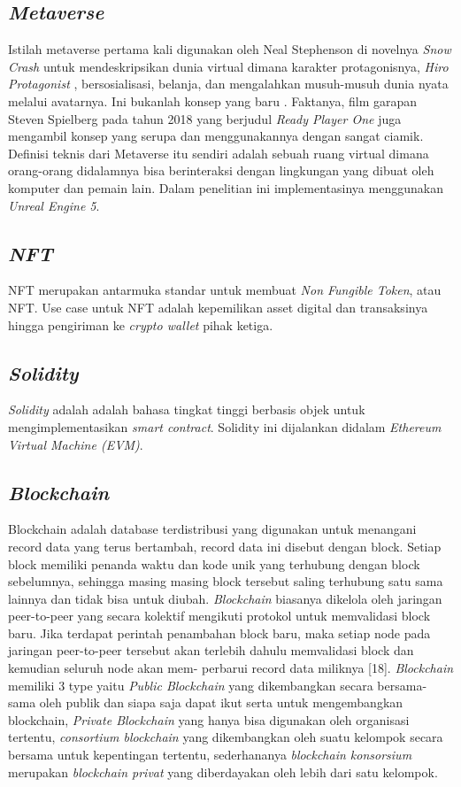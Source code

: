 \subsection{\emph{Metaverse}}

Istilah metaverse pertama kali digunakan oleh Neal Stephenson di novelnya \emph{Snow Crash} untuk
mendeskripsikan dunia virtual dimana karakter protagonisnya, \emph{Hiro Protagonist}
, bersosialisasi, belanja, dan mengalahkan musuh-musuh dunia nyata melalui avatarnya. Ini bukanlah konsep yang baru
. Faktanya, film garapan Steven Spielberg pada tahun 2018 yang berjudul \emph{Ready Player One} juga mengambil konsep yang serupa dan
menggunakannya dengan sangat ciamik. Definisi teknis dari Metaverse itu sendiri adalah sebuah ruang virtual dimana orang-orang didalamnya bisa berinteraksi
dengan lingkungan yang dibuat oleh komputer dan pemain lain. Dalam penelitian ini implementasinya menggunakan
\emph{Unreal Engine 5}.

\subsection{\emph{NFT}}
NFT merupakan antarmuka standar untuk membuat \emph{Non Fungible Token}, atau NFT.
Use case untuk NFT adalah kepemilikan asset digital dan transaksinya hingga pengiriman ke
\emph{crypto wallet} pihak ketiga.

\subsection{\emph{Solidity}}
\emph{Solidity} adalah adalah bahasa tingkat tinggi berbasis objek untuk mengimplementasikan
\emph{smart contract}. Solidity ini dijalankan didalam \emph{Ethereum Virtual Machine (EVM)}.


\subsection{\emph{Blockchain}}

Blockchain adalah database terdistribusi yang digunakan
untuk menangani record data yang terus bertambah, record data ini
disebut dengan block. Setiap block memiliki penanda waktu dan
kode unik yang terhubung dengan block sebelumnya, sehingga masing
masing block tersebut saling terhubung satu sama lainnya dan
tidak bisa untuk diubah. \emph{Blockchain} biasanya dikelola oleh jaringan
peer-to-peer yang secara kolektif mengikuti protokol untuk
memvalidasi block baru. Jika terdapat perintah penambahan block baru,
maka setiap node pada jaringan peer-to-peer tersebut akan terlebih
dahulu memvalidasi block dan kemudian seluruh node akan mem-
perbarui record data miliknya [18]. \emph{Blockchain} memiliki 3 type \parencite{url:blockchaintype}
yaitu \emph{Public Blockchain} yang dikembangkan secara bersama-sama
oleh publik dan siapa saja dapat ikut serta untuk mengembangkan
blockchain, \emph{Private Blockchain} yang hanya bisa digunakan oleh
organisasi tertentu, \emph{consortium blockchain} yang dikembangkan oleh
suatu kelompok secara bersama untuk kepentingan tertentu,
sederhananya \emph{blockchain konsorsium} merupakan \emph{blockchain privat} yang
diberdayakan oleh lebih dari satu kelompok.

